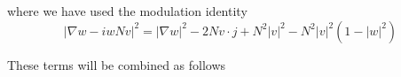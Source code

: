 \documentclass[a4paper]{article}
\renewcommand{\div}{\mathrm{div}}
\newlength{\horizspace}
\newlength{\smallspace}
\begin{document}

where we have used the modulation identity
\begin{equation}
  | \nabla w - i w N v |^2 = | \nabla w |^2 - 2 N v \cdot j + N^2 |v|^2 - N^2 |v|^2 ( 1 - |w|^2 )
  \label{eq:mod_identity}
\end{equation}

These terms will be combined as follows
\end{document}
